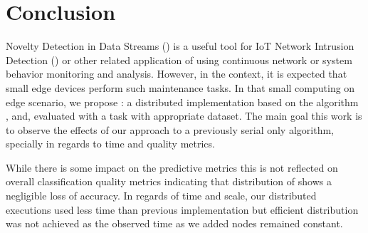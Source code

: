 
\section{Conclusion} 
\label{sec:conclusion}


Novelty Detection in Data Streams (\nd) is a useful tool for IoT Network
Intrusion Detection (\nids) or other related application of \nd using continuous
network or system behavior monitoring and analysis.
However, in the \iot context, it is expected that small edge devices perform
such maintenance tasks.
In that small computing on edge scenario, we propose \mfog: a distributed \nd
implementation based on the \nd algorithm \minas, and, evaluated with a \nids
task with appropriate dataset.
The main goal this work is to observe the effects of our approach to a
previously serial only algorithm, specially in regards to time and quality
metrics.


While there is some impact on the predictive metrics this is not reflected on
overall classification quality metrics indicating that distribution of \minas
shows a negligible loss of accuracy.
In regards of time and scale, our distributed executions used less time than
previous implementation but efficient distribution was not achieved as the
observed time as we added nodes remained constant.


